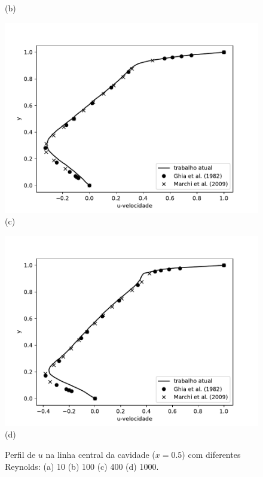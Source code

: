 \begin{center}
\begin{figure}[H]
\begin{minipage}{.5\linewidth}
      (b)
     \end{minipage}
     \begin{minipage}{.5\linewidth}
      \centering
      \includegraphics[scale=0.53]{./02_chaps/cap_validation/figure/Re_400_u_profile.pdf}\\
      (c)
     \end{minipage}%
     \begin{minipage}{.5\linewidth}
      \centering
      \includegraphics[scale=0.53]{./02_chaps/cap_validation/figure/Re_1000_u_profile.pdf}\\
      (d)
     \end{minipage}
     \medskip
     \caption{Perfil de $u$ na linha central da cavidade ($x=0.5$) com diferentes Reynolds:
     (a) 10
     (b) 100
     (c) 400
     (d) 1000.}
     \label{velocity vx cavity}
\end{figure}
\end{center}

